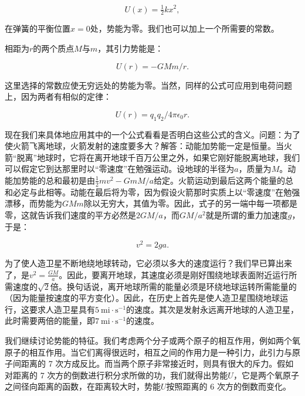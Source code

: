 \documentclass[12pt,oneside]{book}
\begin{document}
\begin{equation}
\label{Eq:I:14:4}
U(x)=\tfrac{1}{2}kx^2,
\end{equation}

在弹簧的平衡位置$x = 0$处，势能为零。我们也可以加上一个所需要的常数。


相距为$r$的两个质点$M$与$m$，其引力势能是：


\begin{equation}
\label{Eq:I:14:5}
U(r) = -GMm/r.
\end{equation}

这里选择的常数应使无穷远处的势能为零。当然，同样的公式可应用到电荷问题上，因为两者有相似的定律：


\begin{equation}
\label{Eq:I:14:6}
U(r) = q_1q_2/4\pi\epsilon_0 r.
\end{equation}

现在我们来具体地应用其中的一个公式看看是否明白这些公式的含义。问题：为了使火箭飞离地球，火箭发射的速度要多大？解答：动能加势能一定是恒量。当火箭“脱离”地球时，它将在离开地球千百万公里之外，如果它刚好能脱离地球，我们可以假定它到达那里时以“零速度”在勉强运动。设地球的半径为$a$，质量为$M$。动能加势能的总和最初是由$\tfrac{1}{2}mv^2 - GmM/a$给定。火箭运动到最后这两个能量的总和必定与此相等。动能在最后将为零，因为假设火箭那时实质上以“零速度”在勉强漂移，而势能为$GMm$除以无穷大，其值为零。因此，式子的另一端中每一项都是零，这就告诉我们速度的平方必然是$2GM/a$，而$GM/a^2$就是所谓的重力加速度$g$，于是：


\begin{equation*}
v^2=2ga.
\end{equation*}

为了使人造卫星不断地绕地球转动，它必须以多大的速度运行？我们早已算出来了，是$v^2=\frac{GM}{a}$。因此，要离开地球，其速度必须是刚好围绕地球表面附近运行所需速度的$\sqrt{2}$倍。换句话说，离开地球所需的能量必须是环绕地球运转所需能量的（因为能量按速度的平方变化）。因此，在历史上首先是使人造卫星围绕地球运行，这要求人造卫星具有$5\ \text{mi}\cdot\text{s}^{-1}$的速度。其次是发射永远离开地球的人造卫星，此时需要两倍的能量，即$7\ \text{mi}\cdot\text{s}^{-1}$的速度。


我们继续讨论势能的特征。我们考虑两个分子或两个原子的相互作用，例如两个氧原子的相互作用。当它们离得很远时，相互之间的作用力是一种引力，此引力与原子间距离的 7 次方成反比。而当两个原子非常接近时，则具有很大的斥力。假如对距离的 7 次方的倒数进行积分求所做的功，我们就得出势能$U$，它是两个氧原子之间径向距离的函数，在距离较大时，势能$U$按照距离的 6 次方的倒数而变化。
\end{document}
